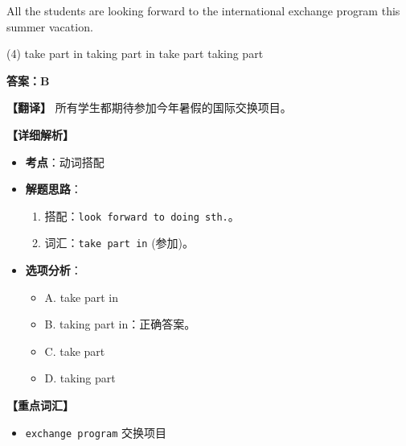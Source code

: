 \documentclass[11pt, a4paper]{article}
\newcommand{\analysis}[4]{
    \begin{solutionbox}
        \textbf{答案：#1}
        
        \textbf{【翻译】} #2
        
        \textbf{【详细解析】}
        #3
        
        \textbf{【重点词汇】}
        #4
    \end{solutionbox}
}
\newcommand{\blank}{\underline{\hspace{1.5cm}}}
\begin{document}
\begin{questions}
    \item All the students are looking forward to \blank the international exchange program this summer vacation.
    \begin{tasks}(4)
        \task take part in \task taking part in \task take part \task taking part
    \end{tasks}
    \analysis{B}{所有学生都期待参加今年暑假的国际交换项目。}{
        \begin{itemize}
            \item \textbf{考点}：动词搭配
            \item \textbf{解题思路}：
                \begin{enumerate}
                    \item 搭配：\texttt{look forward to doing sth.}。
                    \item 词汇：\texttt{take part in} (参加)。
                \end{enumerate}
            \item \textbf{选项分析}：
                \begin{itemize}
                    \item A. take part in
                    \item B. taking part in：正确答案。
                    \item C. take part
                    \item D. taking part
                \end{itemize}
        \end{itemize}
    }{
        \begin{itemize}
            \item \texttt{exchange program} 交换项目
        \end{itemize}
    }


\end{questions}
\end{document}
